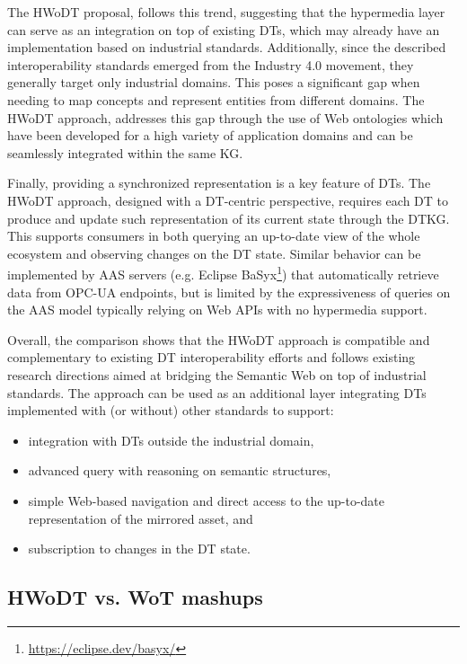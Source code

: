 The \ac{HWoDT} proposal, follows this trend, suggesting that the hypermedia layer can serve as an integration on top of existing \acp{DT}, which may already have an implementation based on industrial standards.
%
Additionally, since the described interoperability standards emerged from the Industry 4.0 movement, they generally target only industrial domains. This poses a significant gap when needing to map concepts and represent entities from different domains.
%
The \ac{HWoDT} approach, addresses this gap through the use of Web ontologies which have been developed for a high variety of application domains and can be seamlessly integrated within the same \ac{KG}.

Finally, providing a synchronized representation is a key feature of \acp{DT}.
The \ac{HWoDT} approach, designed with a \ac{DT}-centric perspective, requires each \ac{DT} to produce and update such representation of its current state through the \ac{DTKG}. This supports consumers in both querying an up-to-date view of the whole ecosystem and observing changes on the \ac{DT} state.
%
Similar behavior can be implemented by \ac{AAS} servers (e.g. Eclipse BaSyx\footnote{\url{https://eclipse.dev/basyx/}}) that automatically retrieve data from \ac{OPC-UA} endpoints, but is limited by the expressiveness of queries on the \ac{AAS} model typically relying on Web APIs with no hypermedia support.

Overall, the comparison shows that the \ac{HWoDT} approach is compatible and complementary to existing \ac{DT} interoperability efforts and follows existing research directions aimed at bridging the Semantic Web on top of industrial standards.
The approach can be used as an additional layer integrating \acp{DT} implemented with (or without) other standards to support:
\begin{itemize}
    \item integration with \acp{DT} outside the industrial domain,
    \item advanced query with reasoning on semantic structures,
    \item simple Web-based navigation and direct access to the up-to-date representation of the mirrored asset,
    and 
    \item subscription to changes in the \ac{DT} state.
\end{itemize}

\subsection{HWoDT vs. WoT mashups}

